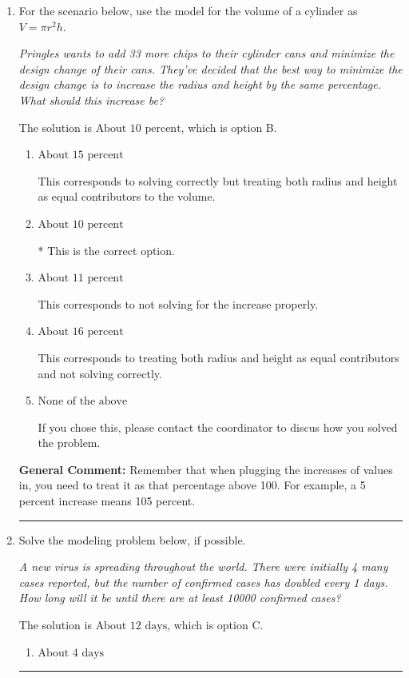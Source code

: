 \documentclass{extbook}[14pt]
\newcommand{\litem}[1]{\item #1

\rule{\textwidth}{0.4pt}}
\begin{document}
\begin{enumerate}\litem{
For the scenario below, use the model for the volume of a cylinder as $V = \pi r^2 h$.

\begin{center}
    \textit{ Pringles wants to add 33 \text{percent} more chips to their cylinder cans and minimize the design change of their cans. They've decided that the best way to minimize the design change is to increase the radius and height by the same percentage. What should this increase be? }
\end{center}
The solution is \( \text{About } 10 \text{ percent} \), which is option B.\begin{enumerate}[label=\Alph*.]
\item \( \text{About } 15 \text{ percent} \)

This corresponds to solving correctly but treating both radius and height as equal contributors to the volume.
\item \( \text{About } 10 \text{ percent} \)

* This is the correct option.
\item \( \text{About } 11 \text{ percent} \)

This corresponds to not solving for the increase properly.
\item \( \text{About } 16 \text{ percent} \)

This corresponds to treating both radius and height as equal contributors and not solving correctly.
\item \( \text{None of the above} \)

If you chose this, please contact the coordinator to discus how you solved the problem.
\end{enumerate}

\textbf{General Comment:} Remember that when plugging the increases of values in, you need to treat it as that percentage above 100. For example, a 5 percent increase means 105 percent.
}
\litem{
Solve the modeling problem below, if possible.

\begin{center}
    \textit{ A new virus is spreading throughout the world. There were initially 4 many cases reported, but the number of confirmed cases has doubled every 1 days. How long will it be until there are at least 10000 confirmed cases? }
\end{center}
The solution is \( \text{About } 12 \text{ days} \), which is option C.\begin{enumerate}[label=\Alph*.]
\item \( \text{About } 4 \text{ days} \)


\end{enumerate}}
\end{enumerate}
\end{document}
